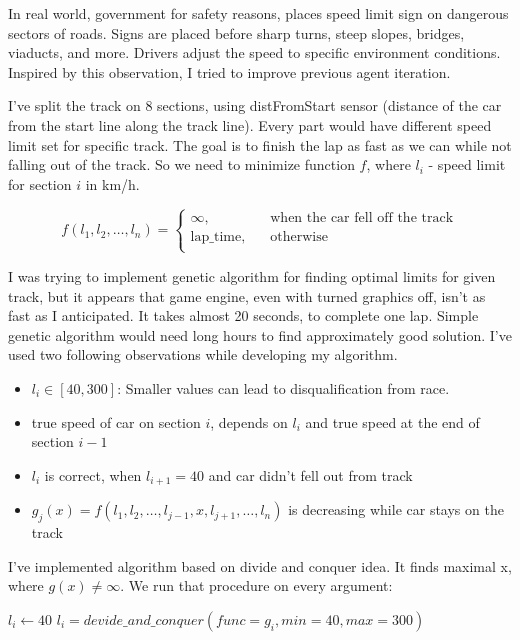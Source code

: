 \documentclass[declaration,shortabstract,english,inz]{iithesis}
\begin{document}
In real world, government for safety reasons, places speed limit sign on dangerous sectors of roads. Signs are placed before sharp turns, steep slopes, bridges, viaducts, and more. Drivers adjust the speed to specific environment conditions. Inspired by this observation, I tried to improve previous agent iteration. 

I've split the track on 8 sections, using distFromStart sensor (distance of the car from the start line along the track line). Every part would have different speed limit set for specific track. The goal is to finish the lap as fast as we can while not falling out of the track. So we need to minimize function $f$, where $l_i$ - speed limit for section $i$ in km/h.

$$ f(l_1, l_2, \dots, l_n ) =  \begin{cases}
    \infty, &\quad \text{when the car fell off the track}\\
    \text{lap\_time}, &\quad \text{otherwise} \\
  \end{cases}
 $$

I was trying to implement genetic algorithm for finding optimal limits for given track, but it appears that game engine, even with turned graphics off, isn't as fast as I anticipated. It takes almost 20 seconds, to complete one lap. Simple genetic algorithm would need long hours to find approximately good solution. I've used two following observations while developing my algorithm.

\begin{itemize}
    \item  $l_i \in [40, 300]$:  Smaller values can lead to disqualification from race.
    \item  true speed of car on section $i$, depends on $l_i$ and true speed at the end of section $i-1$
    \item
    $l_i$ is correct, when $l_{i+1} = 40$ and car didn't fell out from track
    \item  $g_j(x) = f(l_1,l_2, \dots,l_{j-1}, x, l_{j+1}, \dots, l_n)$ is decreasing while car stays on the track
    
\end{itemize}


I've implemented algorithm based on divide and conquer idea. It finds maximal x, where $g(x) \neq \infty$. We run that procedure on every argument:

\begin{algorithmic}
    \STATE $l_i\gets 40$
        \STATE $l_i = devide\_and\_conquer(func=g_i, min=40, max=300)$
    \ENDFOR
\end{algorithmic}
\end{document}
